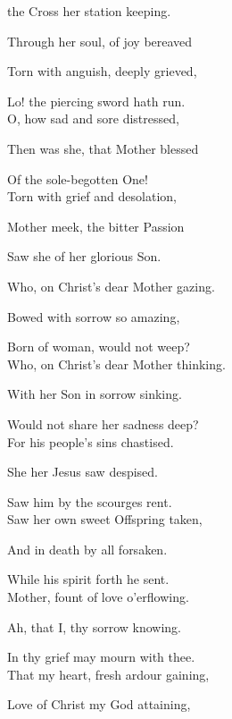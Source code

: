 \begin{multicols}{2}
 the Cross her station keeping.



Through her soul, of joy bereaved

Torn with anguish, deeply grieved,

Lo! the piercing sword hath run.\\

O, how sad and sore distressed,

Then was she, that Mother blessed

Of the sole-begotten One!\\

Torn with grief and desolation,

Mother meek, the bitter Passion

Saw she of her glorious Son.

\columnbreak

Who, on Christ's dear Mother gazing.

Bowed with sorrow so amazing,

Born of woman, would not weep?\\

Who, on Christ's dear Mother thinking.

With her Son in sorrow sinking.

Would not share her sadness deep?\\

For his people's sins chastised.

She her Jesus saw despised.

Saw him by the scourges rent.\\

Saw her own sweet Offspring taken,

And in death by all forsaken.

While his spirit forth he sent.\\

Mother, fount of love o'erflowing.

Ah, that I, thy sorrow knowing.

In thy grief may mourn with thee.\\

That my heart, fresh ardour gaining,

Love of Christ my God attaining,


\end{multicols}
